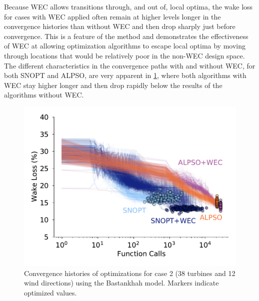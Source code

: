 \documentclass[hidelinks,sort&compress,AMA,STIX1COL]{WileyNJD-v2}
\providecommand{\DIFaddbeginFL}{} %
\providecommand{\DIFaddendFL}{} %
\providecommand{\DIFdelbeginFL}{} %
\providecommand{\DIFdelendFL}{} %
\newcommand{\DIFscaledelfig}{0.5}
\newlength{\DIFdelgraphicswidth} %
\newlength{\DIFdelgraphicsheight} %
\newcommand{\DIFaddincludegraphics}[2][]{{\color{blue}\fbox{\DIFOincludegraphics[#1]{#2}}}} %
\newcommand{\DIFdelincludegraphics}[2][]{%
\sbox{\DIFdelgraphicsbox}{\DIFOincludegraphics[#1]{#2}}%
\settoboxwidth{\DIFdelgraphicswidth}{\DIFdelgraphicsbox} %
\settoboxtotalheight{\DIFdelgraphicsheight}{\DIFdelgraphicsbox} %
\scalebox{\DIFscaledelfig}{%
\parbox[b]{\DIFdelgraphicswidth}{\usebox{\DIFdelgraphicsbox}\\[-\baselineskip] \rule{\DIFdelgraphicswidth}{0em}}\llap{\resizebox{\DIFdelgraphicswidth}{\DIFdelgraphicsheight}{%
\setlength{\unitlength}{\DIFdelgraphicswidth}%
\begin{picture}(1,1)%
\thicklines\linethickness{2pt} %
{\color[rgb]{1,0,0}\put(0,0){\framebox(1,1){}}}%
{\color[rgb]{1,0,0}\put(0,0){\line( 1,1){1}}}%
{\color[rgb]{1,0,0}\put(0,1){\line(1,-1){1}}}%
\end{picture}%
}\hspace*{3pt}}} %
} %
\DeclareRobustCommand{\DIFaddbeginFL}{\DIFOaddbeginFL \let\includegraphics\DIFaddincludegraphics} %
\DeclareRobustCommand{\DIFaddendFL}{\DIFOaddendFL \let\includegraphics\DIFOincludegraphics} %
\DeclareRobustCommand{\DIFdelbeginFL}{\DIFOdelbeginFL \let\includegraphics\DIFdelincludegraphics} %
\DeclareRobustCommand{\DIFdelendFL}{\DIFOaddendFL \let\includegraphics\DIFOincludegraphics} %
\begin{document}
Because WEC allows transitions through, and out of, local optima, the wake loss for cases with WEC applied often remain at higher levels longer in the convergence histories than without WEC and then drop sharply just before convergence. This is a feature of the method and demonstrates the effectiveness of WEC at allowing optimization algorithms to escape local optima by moving through locations that would be relatively poor in the non-WEC design space. The different characteristics in the convergence paths with and without WEC, for both SNOPT and ALPSO, are very apparent in \cref{fig:case-2-histories}, where both algorithms with WEC stay higher longer and then drop rapidly below the results of the algorithms without WEC.

\begin{figure}[h!]
	\centering
	\begin{minipage}[t]{.45\textwidth}
		\centering
		\DIFdelbeginFL %
\DIFdelendFL \DIFaddbeginFL \includegraphics[width=\textwidth]{final_images/results/Figure_21}  
		\DIFaddendFL \caption{Convergence histories of optimizations for case 2 (38 turbines and 12 wind directions) using the Bastankhah model. Markers indicate optimized values.}
		\label{fig:case-2-histories}
	\end{minipage}\hspace{1pc}
	\begin{minipage}[t]{0.45\textwidth}
		\centering
		\DIFdelbeginFL %

\end{minipage}
\end{figure}
\end{document}
